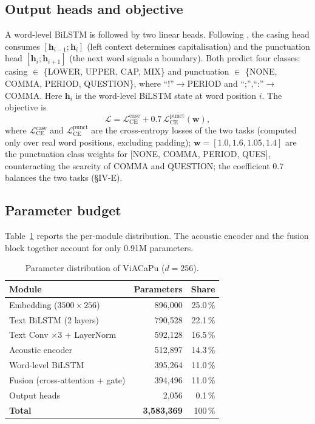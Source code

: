 \documentclass[conference]{IEEEtran}
\begin{document}
\subsection{Output heads and objective}
A word-level BiLSTM is followed by two linear heads. Following
\cite{you2024lightweight}, the casing head consumes $[\mathbf{h}_{i-1};\mathbf{h}_i]$
(left context determines capitalisation) and the punctuation head
$[\mathbf{h}_i;\mathbf{h}_{i+1}]$ (the next word signals a boundary). Both predict
four classes: casing $\in$ \{LOWER, UPPER, CAP, MIX\} and punctuation $\in$
\{NONE, COMMA, PERIOD, QUESTION\}, where ``!''$\rightarrow$PERIOD and
``;'',``:''$\rightarrow$COMMA. Here $\mathbf{h}_i$ is the word-level BiLSTM state
at word position $i$. The objective is
\begin{equation}
\mathcal{L} = \mathcal{L}_{\mathrm{CE}}^{\mathrm{case}}
            + 0.7\,\mathcal{L}_{\mathrm{CE}}^{\mathrm{punct}}(\mathbf{w}),
\end{equation}
where $\mathcal{L}_{\mathrm{CE}}^{\mathrm{case}}$ and
$\mathcal{L}_{\mathrm{CE}}^{\mathrm{punct}}$ are the cross-entropy losses of the
two tasks (computed only over real word positions, excluding padding);
$\mathbf{w}=[1.0,1.6,1.05,1.4]$ are the punctuation class weights for [NONE, COMMA,
PERIOD, QUES], counteracting the scarcity of COMMA and QUESTION; the coefficient
$0.7$ balances the two tasks (\S IV-E).

\subsection{Parameter budget}
Table~\ref{tab:params} reports the per-module distribution. The acoustic encoder and
the fusion block together account for only 0.91M parameters.

\begin{table}[t]
\caption{Parameter distribution of ViACaPu ($d=256$).}
\label{tab:params}
\centering
\begin{tabular}{lrr}
\toprule
Module & Parameters & Share \\
\midrule
Embedding ($3500\times256$)      & 896{,}000  & 25.0\,\% \\
Text BiLSTM (2 layers)           & 790{,}528  & 22.1\,\% \\
Text Conv $\times3$ + LayerNorm  & 592{,}128  & 16.5\,\% \\
Acoustic encoder                 & 512{,}897  & 14.3\,\% \\
Word-level BiLSTM                & 395{,}264  & 11.0\,\% \\
Fusion (cross-attention + gate)  & 394{,}496  & 11.0\,\% \\
Output heads                     & 2{,}056    & \phantom{0}0.1\,\% \\
\midrule
\textbf{Total}                   & \textbf{3{,}583{,}369} & 100\,\% \\
\bottomrule
\end{tabular}
\end{table}
\end{document}
